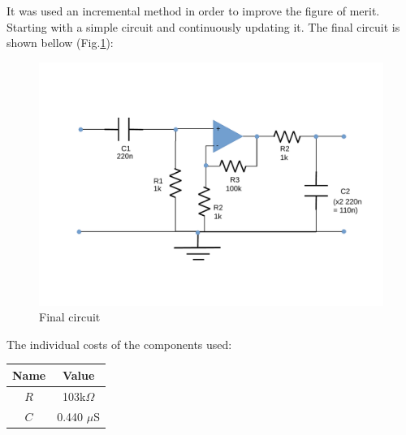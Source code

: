 It was used an incremental method in order to improve the figure of merit. Starting with a simple circuit and continuously updating it. The final circuit is shown bellow (Fig.\ref{fig:circuito}): \par

\begin{figure}[H]
\centering
\includegraphics[width=0.9\linewidth]{circuito}
\caption{Final circuit}
\label{fig:circuito}
\end{figure}

The individual costs of the components used: 

\begin{center}
  \begin{tabular}{ | c | c | }
    \hline    
    {\bf Name} & {\bf Value} \\ \hline
    $R$ & 103k$\Omega$ \\ \hline 
    $C$ & 0.440 $\mu$S \\ 
    \hline
  \end{tabular}
\end{center}

\newpage